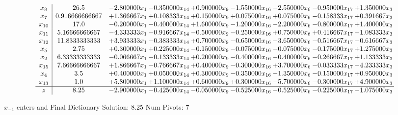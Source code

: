 \documentclass[10pt]{article}
\begin{document}
 \[\begin{array}{c| c c@{\hskip 2pt} c@{\hskip 2pt} c@{\hskip 2pt} c@{\hskip 2pt} c@{\hskip 2pt} c@{\hskip 2pt} c@{\hskip 2pt} }
 x_{8}   &  26.5 & -2.800000 x_{1} & -0.350000 x_{14} & + 0.900000 x_{9} & -1.550000 x_{16} & -2.550000 x_{6} & -0.950000 x_{17} & + 1.350000 x_{3}\\
 x_{7}   &  0.916666666667 & + 1.366667 x_{1} & + 0.108333 x_{14} & + 0.150000 x_{9} & + 0.075000 x_{16} & + 0.075000 x_{6} & -0.158333 x_{17} & + 0.391667 x_{3}\\
 x_{10}   &  17.0 & -0.200000 x_{1} & -0.400000 x_{14} & + 1.600000 x_{9} & -1.200000 x_{16} & -2.200000 x_{6} & -0.800000 x_{17} & + 1.400000 x_{3}\\
 x_{11}   &  5.16666666667 & -4.333333 x_{1} & -0.916667 x_{14} & -0.500000 x_{9} & -0.250000 x_{16} & + 0.750000 x_{6} & + 0.416667 x_{17} & -1.083333 x_{3}\\
 x_{12}   &  11.8333333333 & + 3.933333 x_{1} & -0.383333 x_{14} & + 0.700000 x_{9} & -0.650000 x_{16} & -3.650000 x_{6} & -0.516667 x_{17} & -0.616667 x_{3}\\
 x_{5}   &  2.75 & + 0.300000 x_{1} & + 0.225000 x_{14} & -0.150000 x_{9} & -0.075000 x_{16} & -0.075000 x_{6} & -0.175000 x_{17} & + 1.275000 x_{3}\\
 x_{2}   &  6.33333333333 & -0.066667 x_{1} & -0.133333 x_{14} & + 0.200000 x_{9} & -0.400000 x_{16} & -0.400000 x_{6} & -0.266667 x_{17} & + 1.133333 x_{3}\\
 x_{15}   &  7.66666666667 & + 1.866667 x_{1} & -0.766667 x_{14} & + 0.400000 x_{9} & -0.300000 x_{16} & + 3.700000 x_{6} & -0.033333 x_{17} & -4.233333 x_{3}\\
 x_{4}   &  3.5 & + 0.400000 x_{1} & + 0.050000 x_{14} & + 0.300000 x_{9} & -0.350000 x_{16} & -1.350000 x_{6} & -0.150000 x_{17} & + 0.950000 x_{3}\\
 x_{13}   &  1.0 & + 5.800000 x_{1} & + 1.100000 x_{14} & + 0.600000 x_{9} & + 0.300000 x_{16} & -5.700000 x_{6} & -0.300000 x_{17} & + 4.900000 x_{3}\\
\hline
z    &  8.25 & -2.900000 x_{1} & -0.425000 x_{14} & -0.050000 x_{9} & -0.525000 x_{16} & -0.525000 x_{6} & -0.225000 x_{17} & -1.075000 x_{3}\\
\end{array}\]


 $ x_{-1} $ enters and Final Dictionary
Solution:  8.25
Num Pivots:  7
\end{document}
